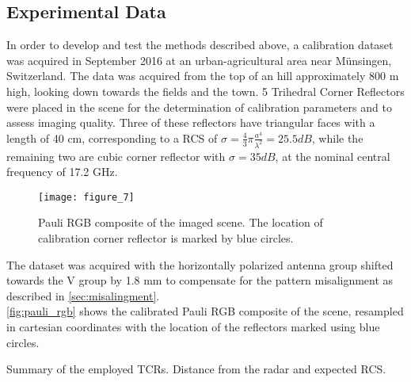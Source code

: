 \subsection{Experimental Data}\label{sec:data}
In order to develop and test the methods described above, a calibration dataset was acquired in September 2016 at an urban-agricultural area near M\"{u}nsingen, Switzerland. The data was acquired from the top of an hill approximately 800 m high, looking down towards the fields and the town. 5 Trihedral Corner Reflectors were placed in the scene for the determination of calibration parameters and to assess imaging quality. Three of these reflectors have triangular faces with a length of 40 cm, corresponding to a RCS of $\sigma=\frac{4}{3}\pi \frac{a^4}{\lambda^2}=25.5 dB$, while the remaining two are cubic corner reflector with $\sigma= 35 dB$, at the nominal central frequency of 17.2 GHz.\\
	\begin{figure}
		\centering
		\texttt{[image: figure\_7]}
		\caption{Pauli RGB composite of the imaged scene. The location of calibration corner reflector is marked by blue circles.}
		\label{fig:pauli_rgb}
	\end{figure}
The dataset was acquired with the horizontally polarized antenna group shifted towards the V group by 1.8 mm to compensate for the pattern misalignment as described in \autoref{sec:misalingment}.\\
\autoref{fig:pauli_rgb} shows the calibrated Pauli RGB composite of the scene, resampled in cartesian coordinates with the location of the reflectors marked using blue circles.

\begin{table}[ht]
	\centering
	\caption{Summary of the employed TCRs. Distance from the radar and expected RCS.}
	\label{tab:reflectors}
\end{table}



